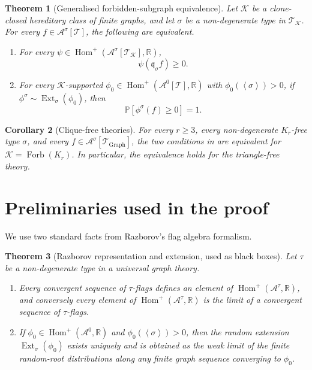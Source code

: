 \documentclass[11pt]{article}
\newtheorem{theorem}{Theorem}
\newtheorem{corollary}[theorem]{Corollary}
\theoremstyle{definition}
\newcommand{\R}{\mathbb{R}}
\newcommand{\Prob}{\mathbb{P}}
\newcommand{\A}{\mathcal{A}}
\newcommand{\K}{\mathcal{K}}
\newcommand{\T}{\mathcal{T}}
\newcommand{\Homp}{\operatorname{Hom}^{+}}
\newcommand{\Ext}{\operatorname{Ext}}
\newcommand{\brak}[1]{\left\langle #1\right\rangle}
\newcommand{\q}{\mathfrak q}
\begin{document}
\begin{theorem}[Generalised forbidden-subgraph equivalence]\label{thm:main}
Let $\K$ be a clone-closed hereditary class of finite graphs, and let
$\sigma$ be a non-degenerate type in $\T_\K$.  For every
$f\in\A^\sigma[\T]$, the following are equivalent.
\begin{enumerate}[label=\textup{(\alph*)}, leftmargin=2.8em]
  \item\label{item:quotient}
  For every $\psi\in\Homp(\A^\sigma[\T_\K],\R)$,
  \[
     \psi(\q_\sigma f)\ge0.
  \]
  \item\label{item:ensemble}
  For every $\K$-supported $\phi_0\in\Homp(\A^0[\T],\R)$ with
  $\phi_0(\brak\sigma)>0$, if $\phi^\sigma\sim\Ext_\sigma(\phi_0)$, then
  \[
     \Prob[\phi^\sigma(f)\ge0]=1.
  \]
\end{enumerate}
\end{theorem}

\begin{corollary}[Clique-free theories]\label{cor:cliques}
For every $r\ge3$, every non-degenerate $K_r$-free type $\sigma$, and every
$f\in\A^\sigma[\T_{\mathrm{Graph}}]$, the two conditions in
 are equivalent for $\K=\operatorname{Forb}(K_r)$.  In
particular, the equivalence holds for the triangle-free theory.
\end{corollary}

\section{Preliminaries used in the proof}

We use two standard facts from Razborov's flag algebra formalism.

\begin{theorem}[Razborov representation and extension, used as black boxes]\label{thm:razborov}
Let $\tau$ be a non-degenerate type in a universal graph theory.
\begin{enumerate}[label=\textup{(\roman*)}, leftmargin=2.8em]
  \item Every convergent sequence of $\tau$-flags defines an element of
  $\Homp(\A^\tau,\R)$, and conversely every element of
  $\Homp(\A^\tau,\R)$ is the limit of a convergent sequence of $\tau$-flags.
  \item If $\phi_0\in\Homp(\A^0,\R)$ and $\phi_0(\brak\sigma)>0$, then the
  random extension $\Ext_\sigma(\phi_0)$ exists uniquely and is obtained as
  the weak limit of the finite random-root distributions along any finite
  graph sequence converging to $\phi_0$.
\end{enumerate}
\end{theorem}
\end{document}
